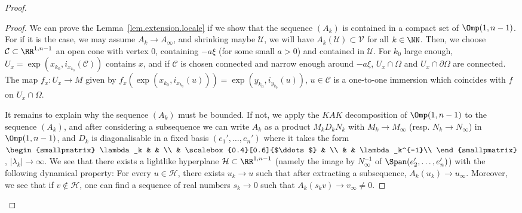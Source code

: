 \begin{proof}
\begin{proof}
We can prove the Lemma~\ref{lem.extension.locale} if we show that the sequence $(A_k)$ is contained in a compact set of $\Omp(1,n-1)$. For if it is the case, we may assume $A_k \to A_{\infty}$, and shrinking maybe $\mathcal{U}$, we will have $A_k(\mathcal{U}) \subset \mathcal{V}$ for all $k \in \NN$. Then, we choose ${\mathcal C} \subset \RR^{1,n-1}$ an open cone with vertex $0$, containing $-a\xi$ (for some small $a>0$) and contained in ${\mathcal U}$. For $k_0$ large enough, $U_x=\exp(x_{k_0}, i_{x_{k_0}}({\mathcal C}))$ contains $x$, and if ${\mathcal C}$ is chosen connected and narrow enough around $-a\xi$, $U_x \cap \Omega$ and $U_x \cap \partial \Omega$ are connected. The map $f_x : U_x \to M$ given by $f_x(\exp(x_{k_0},i_{x_{k_0}}(u)))=\exp(y_{k_0},i_{y_{k_0}}(u))$, $u \in {\mathcal C}$ is a one-to-one immersion which coincides with $f$ on $U_x \cap \Omega$.

It remains to explain why the sequence $(A_k)$ must be bounded. If not, we apply the $KAK$ decomposition of $\Omp(1,n-1)$ to the sequence $(A_k)$, and after considering a subsequence we can write $A_k$ as a product $M_kD_kN_k$ with $M_k \to M_{\infty}$ (resp. $N_k \to N_{\infty}$) in $\Omp(1,n-1)$, and $D_k$ is diagonalisable in a fixed basis $(e_1',\ldots,e_n')$ where it takes the form $
\begin{smallpmatrix} \lambda_k & & \\
& \scalebox{0.4}[0.6]{$\ddots$} & \\
& & \lambda_k^{-1}\\
\end{smallpmatrix} $, $|\lambda_k| \to \infty$. We see that there exists a lightlike hyperplane ${\mathcal H} \subset \RR^{1,n-1}$ (namely the image by $N_{\infty}^{-1}$ of $\Span(e_2',\ldots,e_n')$) with the following dynamical property: For every $u \in {\mathcal H}$, there exists $u_k \to u$ such that after extracting a subsequence, $A_k(u_k) \to u_{\infty}$. Moreover, we see that if $v \not \in {\mathcal H}$, one can find a sequence of real numbers $s_k \to 0$ such that $A_k(s_kv) \to v_{\infty} \not = 0$.


\end{proof}
\end{proof}
